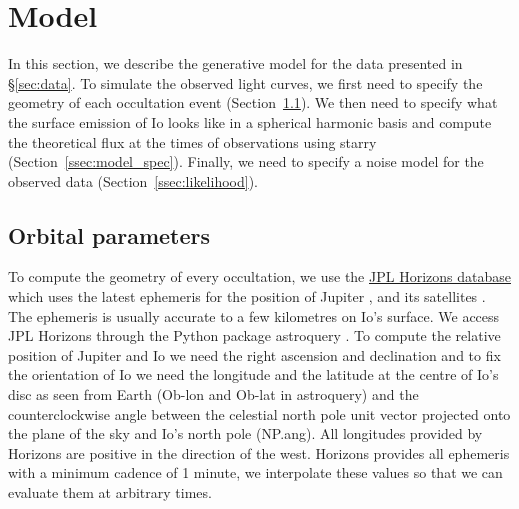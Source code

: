 \documentclass[12pt,dvipsnames]{report}
\begin{document}
\section{Model}
\label{sec:io_model}
In this section, we describe the generative model for the data presented in \S\ref{sec:data}.
To simulate the observed light curves, we first need to specify the geometry of each occultation event (Section~\ref{ssec:orbital_parameters}). 
We then need to specify what the surface emission of Io looks like in a spherical harmonic basis and compute the theoretical flux at the times of observations using \textsf{starry} (Section~\ref{ssec:model_spec}).
Finally, we need to specify a noise model for the observed data (Section~\ref{ssec:likelihood}).

\subsection{Orbital parameters}
\label{ssec:orbital_parameters}
To compute the geometry of every occultation, we use the 
\href{https://ssd.jpl.nasa.gov/horizons.cgi}{JPL Horizons database} which uses the 
latest ephemeris for the position of Jupiter \citep{2014IPNPR.196C...1F}, and its 
satellites \citep{2015IAUGA..2233438J}.
The ephemeris is usually accurate to a few kilometres on Io's surface.
We access JPL Horizons through the Python package \textsf{astroquery} 
\citep{2019AJ....157...98G}.
To compute the relative position of Jupiter and Io we need the right ascension and 
declination and to fix the orientation of Io we need the longitude and the latitude 
at the centre of Io's disc as seen from Earth (\textsf{Ob-lon} and \textsf{Ob-lat} in 
\textsf{astroquery}) and the counterclockwise angle between the celestial north pole 
unit vector projected onto the plane of the sky and Io's north pole (\textsf{NP.ang}).
All longitudes provided by Horizons are positive  in the direction of the west.
Horizons provides all ephemeris with a minimum cadence of 1 minute, we interpolate these 
values so that we can evaluate them at arbitrary times.
\end{document}
